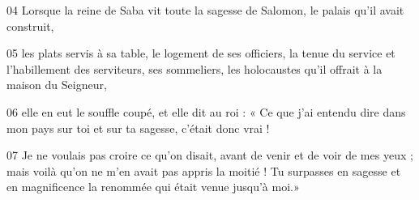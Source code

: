 
04 Lorsque la reine de Saba vit toute la sagesse de Salomon, le palais qu’il avait construit,

05 les plats servis à sa table, le logement de ses officiers, la tenue du service et l’habillement des serviteurs, ses sommeliers, les holocaustes qu’il offrait à la maison du Seigneur,

06 elle en eut le souffle coupé, et elle dit au roi : « Ce que j’ai entendu dire dans mon pays sur toi et sur ta sagesse, c’était donc vrai !

07 Je ne voulais pas croire ce qu’on disait, avant de venir et de voir de mes yeux ; mais voilà qu’on ne m’en avait pas appris la moitié ! Tu surpasses en sagesse et en magnificence la renommée qui était venue jusqu’à moi.»
